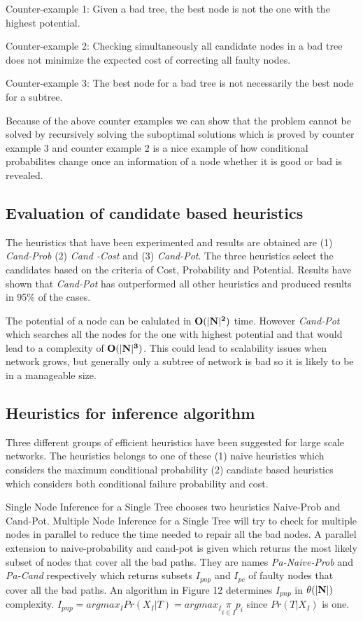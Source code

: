 \documentclass[10pt]{sigplan-proc-varsize}
\begin{document}
Counter-example 1: Given a bad tree, the best node is not the one with the highest potential.

Counter-example 2: Checking simultaneously all candidate nodes in a bad tree does not minimize the expected cost of correcting all faulty nodes.

Counter-example 3: The best node for a bad tree is not necessarily the best node for a subtree.

Because of the above counter examples we can show that the problem cannot be solved by recursively solving the suboptimal solutions which is proved by counter example 3 and counter example 2 is a nice example of how conditional probabilites change once an information of a node whether it is good or bad is revealed. 

\subsection{Evaluation of candidate based heuristics}

The heuristics that have been experimented and results are obtained  are (1) {\it Cand-Prob} (2) {\it Cand -Cost} and (3) {\it Cand-Pot}. The three heuristics select the candidates based on the criteria of Cost, Probability and Potential. Results have shown that {\it Cand-Pot} has outperformed all other heuristics and produced results in 95\% of the cases.

The potential of a node can be calulated in ${\bf O(|N|^2)}$ time. However {\it Cand-Pot} which searches all the nodes for the one with highest potential and that would lead to a complexity of ${\bf O(|N|^3)}$. This could lead to scalability issues when network grows, but generally only a subtree of network is bad so it is likely to be in a manageable size.

\subsection {Heuristics for inference algorithm}
Three different groups of efficient heuristics have been suggested for large scale networks. The heuristics belongs to one of these (1) naive heuristics which considers the maximum conditional probability (2) candiate based heuristics which considers both conditional failure probability and cost.

Single Node Inference for a Single Tree chooses  two heuristics Naive-Prob and Cand-Pot. Multiple Node Inference for a Single Tree will try to check for multiple nodes in parallel to reduce the time needed to repair all the bad nodes. A parallel extension to naive-probability and cand-pot is given which returns the most likely subset of nodes that cover all the bad paths. They are names {\it Pa-Naive-Prob} and {\it Pa-Cand} respectively which returns subsets $I_{pnp}$ and $I_{pc}$ of faulty nodes that cover all the bad paths.  An algorithm in Figure 12 determines $I_{pnp}$ in ${\bf {\theta(|N|)}}$ complexity. $I_{pnp} = argmax_I Pr(X_I|T )=argmax_I\underset{i\in I}{\pi}p_i$ since $Pr(T |X_I )$ is one.
\end{document}
